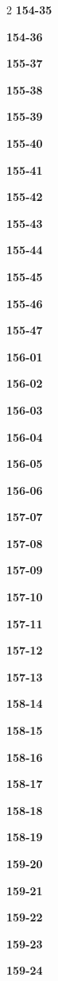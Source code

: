 \documentclass[10pt,a4paper]{article}
\begin{document}
\begin{multicols}{2}
\noindent\textbf{154-35}\ \par
\noindent\textbf{154-36}\ \par
\noindent\textbf{155-37}\ \par
\noindent\textbf{155-38}\ \par
\noindent\textbf{155-39}\ \par
\noindent\textbf{155-40}\ \par
\noindent\textbf{155-41}\ \par
\noindent\textbf{155-42}\ \par
\noindent\textbf{155-43}\ \par
\noindent\textbf{155-44}\ \par
\noindent\textbf{155-45}\ \par
\noindent\textbf{155-46}\ \par
\noindent\textbf{155-47}\ \par
\noindent\textbf{156-01}\ \par
\noindent\textbf{156-02}\ \par
\noindent\textbf{156-03}\ \par
\noindent\textbf{156-04}\ \par
\noindent\textbf{156-05}\ \par
\noindent\textbf{156-06}\ \par
\noindent\textbf{157-07}\ \par
\noindent\textbf{157-08}\ \par
\noindent\textbf{157-09}\ \par
\noindent\textbf{157-10}\ \par
\noindent\textbf{157-11}\ \par
\noindent\textbf{157-12}\ \par
\noindent\textbf{157-13}\ \par
\noindent\textbf{158-14}\ \par
\noindent\textbf{158-15}\ \par
\noindent\textbf{158-16}\ \par
\noindent\textbf{158-17}\ \par
\noindent\textbf{158-18}\ \par
\noindent\textbf{158-19}\ \par
\noindent\textbf{159-20}\ \par
\noindent\textbf{159-21}\ \par
\noindent\textbf{159-22}\ \par
\noindent\textbf{159-23}\ \par
\noindent\textbf{159-24}\ \par

\end{multicols}
\end{document}
